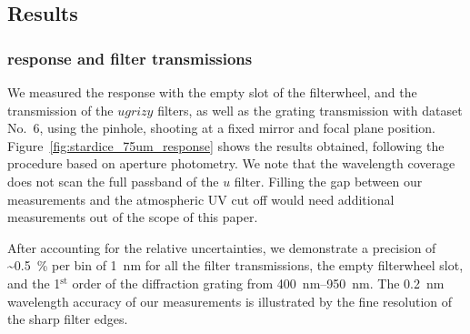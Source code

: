 %
%
%
%

\subsection{Results}
\subsubsection{\SD response and filter transmissions}

We measured the \SD response with the empty slot of the filterwheel, and the transmission of the $ugrizy$ filters, as well as the grating transmission with dataset No.~6, using the \spinhole pinhole, shooting at a fixed mirror and focal plane position. Figure~\ref{fig:stardice_75um_response} shows the results obtained, following the procedure based on aperture photometry. We note that the wavelength coverage does not scan the full passband of the $u$ filter. Filling the gap between our measurements and the atmospheric UV cut off would need additional measurements out of the scope of this paper.

After accounting for the relative uncertainties, we demonstrate a precision of \textasciitilde\SI{0.5}{\%} per bin of \SI{1}{nm} for all the filter transmissions, the empty filterwheel slot, and the 1$^\mathrm{st}$ order of the diffraction grating from \SIrange{400}{950}{\nano\meter}. The \SI{0.2}{nm} wavelength accuracy of our measurements is illustrated by the fine resolution of the sharp filter edges.



